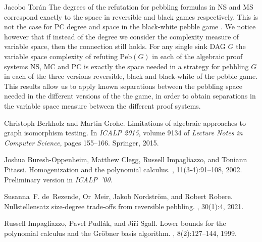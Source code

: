 \documentclass[report]{owrart}
\newcommand{\peb}{\mathrm {Peb}}
\begin{document}
\begin{report}
\begin{talk}{Jacobo Tor\'{a}n}
The degrees of  the refutation for  pebbling formulas in NS and  MS correspond exactly to the space in reversible and black games respectively.
This is not the case for  PC degree and space
in the black-white pebble game \cite{BCIP02Homogenization}. 
We notice however that if instead of the degree we consider the 
complexity measure of variable space, then  the connection still holds.
For any single sink DAG $G$
the variable space complexity of refuting $\peb(G)$ in each of the 
algebraic proof systems NS, MC and PC is exactly the 
space needed in a strategy for pebbling $G$ in each of the three versions
reversible, black and black-white of the pebble game.
This results allow us to apply known separations between the pebbling space needed in the different versions of the the game, in order to obtain
separations in the variable space measure between the different proof systems.



  
  \begin{thebibliography}{99}
  
Christoph Berkholz and Martin Grohe.
\newblock Limitations of algebraic approaches to graph isomorphism testing.
\newblock In {\em {ICALP} 2015}, volume 9134 of {\em Lecture Notes in Computer
  Science}, pages 155--166. Springer, 2015.

Joshua {Buresh-Oppenheim}, Matthew Clegg, Russell Impagliazzo, and Toniann
  Pitassi.
\newblock Homogenization and the polynomial calculus.
, 11(3-4):91--108, 2002.
\newblock Preliminary version in \emph{ICALP~'00}.

Susanna~F. de~Rezende, Or~Meir, Jakob Nordstr{\"{o}}m, and Robert Robere.
\newblock Nullstellensatz size-degree trade-offs from reversible pebbling.
, 30(1):4, 2021.

Russell Impagliazzo, Pavel Pudl{\'a}k, and Ji{\v{r}}\'i Sgall.
\newblock Lower bounds for the polynomial calculus and the {G}r{\"o}bner basis
  algorithm.
, 8(2):127--144, 1999.

    
  
  \end{thebibliography}
  
  \end{talk}
  

   




\end{report}
\end{document}
